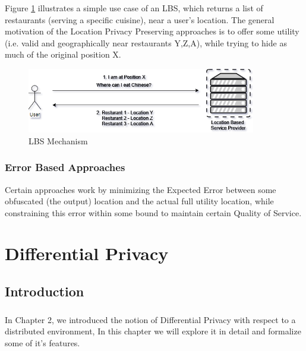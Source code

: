 \documentclass{report}
\begin{document}
Figure \ref{fig:LBSMechanism} illustrates a simple use case of an LBS, which returns a list of restaurants (serving a specific cuisine), near a user's location. The general motivation of the Location Privacy Preserving approaches is to offer some utility (i.e. valid and geographically near restaurants Y,Z,A), while trying to hide as much of the original position X.



\begin{figure}[ht]
\centering
        \includegraphics[width=100mm,scale=0.5]{Images/LBS-Scenario.png}
    \caption{LBS Mechanism}
    \label{fig:LBSMechanism}
\end{figure}

\subsection{Error Based Approaches}
Certain approaches work by minimizing the Expected Error between some obfuscated (the output) location and the actual full utility location, while constraining this error within some bound to maintain certain Quality of Service. 



\chapter{Differential Privacy}
\section{Introduction}
\paragraph{}
In Chapter 2, we introduced the notion of Differential Privacy with respect to a distributed environment, In this chapter we will explore it in detail and formalize some of it's features. 
\end{document}

